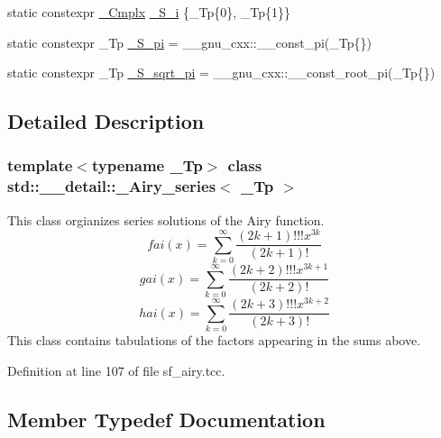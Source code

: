 \begin{DoxyCompactItemize}
\item 
static constexpr \hyperlink{classstd_1_1____detail_1_1__Airy__series_ab41161caa54609f4735987fbaed41d9d}{\+\_\+\+Cmplx} \hyperlink{classstd_1_1____detail_1_1__Airy__series_a4133b308af0c967a73c918af22c93b09}{\+\_\+\+S\+\_\+i} \{\+\_\+\+Tp\{0\}, \+\_\+\+Tp\{1\}\}
\item 
static constexpr \+\_\+\+Tp \hyperlink{classstd_1_1____detail_1_1__Airy__series_a9de354dae47d41acc60824681d864184}{\+\_\+\+S\+\_\+pi} = \+\_\+\+\_\+gnu\+\_\+cxx\+::\+\_\+\+\_\+const\+\_\+pi(\+\_\+\+Tp\{\})
\item 
static constexpr \+\_\+\+Tp \hyperlink{classstd_1_1____detail_1_1__Airy__series_a3fd1fba37ef8beb0d89854d4e58b8a38}{\+\_\+\+S\+\_\+sqrt\+\_\+pi} = \+\_\+\+\_\+gnu\+\_\+cxx\+::\+\_\+\+\_\+const\+\_\+root\+\_\+pi(\+\_\+\+Tp\{\})
\end{DoxyCompactItemize}


\subsection{Detailed Description}
\subsubsection*{template$<$typename \+\_\+\+Tp$>$\newline
class std\+::\+\_\+\+\_\+detail\+::\+\_\+\+Airy\+\_\+series$<$ \+\_\+\+Tp $>$}

This class orgianizes series solutions of the Airy function. \[ fai(x) = \sum_{k=0}^\infty \frac{(2k+1)!!!x^{3k}}{(2k+1)!} \] \[ gai(x) = \sum_{k=0}^\infty \frac{(2k+2)!!!x^{3k+1}}{(2k+2)!} \] \[ hai(x) = \sum_{k=0}^\infty \frac{(2k+3)!!!x^{3k+2}}{(2k+3)!} \] This class contains tabulations of the factors appearing in the sums above. 

Definition at line 107 of file sf\+\_\+airy.\+tcc.



\subsection{Member Typedef Documentation}
\mbox{\label{classstd_1_1____detail_1_1__Airy__series_ab41161caa54609f4735987fbaed41d9d}} 
